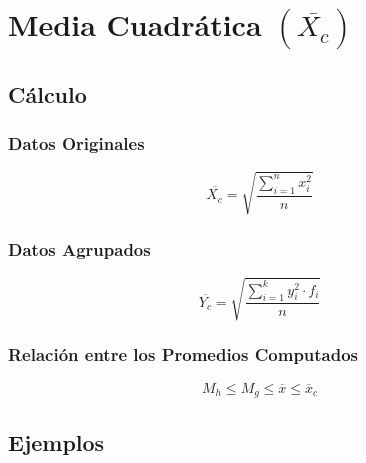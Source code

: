 \section{Media Cuadrática $(\overline{X_c})$}
\subsection{Cálculo}
\subsubsection{Datos Originales}
$$\overline{X_c}=\sqrt{\dfrac{\displaystyle\sum_{i=1}^{n}x_i^2}{n}}$$
\subsubsection{Datos Agrupados}
$$\overline{Y_c}=\sqrt{\dfrac{\displaystyle\sum_{i=1}^{k}y_i^2\cdot f_i}{n}}$$
\subsubsection{Relación entre los Promedios Computados}
$$M_h\leq M_g \leq \overline{x}\leq \overline{x}_c$$
\subsection{Ejemplos}